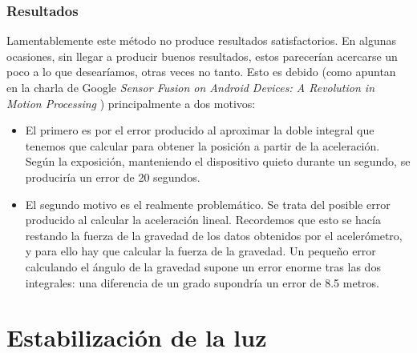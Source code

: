 \documentclass[a4paper,openright, 12pt]{book}
\begin{document}
\subsection{Resultados}
Lamentablemente este método no produce resultados satisfactorios. En algunas ocasiones, sin llegar a producir buenos resultados, estos parecerían acercarse un poco a lo que desearíamos, otras veces no tanto. Esto es debido  (como apuntan en la charla de Google \textit{Sensor Fusion on Android Devices: A Revolution in Motion Processing} \cite{googlesensor}) principalmente a dos motivos:
\begin{itemize}
\item El primero es por el error producido al aproximar la doble integral que tenemos que calcular para obtener la posición a partir de la aceleración. Según la exposición, manteniendo el dispositivo quieto durante un segundo, se produciría un error de 20 segundos.
\item El segundo motivo es el realmente problemático. Se trata del posible error producido al calcular la aceleración lineal. Recordemos que esto se hacía restando la fuerza de la gravedad de los datos obtenidos por el acelerómetro, y para ello hay que calcular la fuerza de la gravedad. Un pequeño error calculando el ángulo de la gravedad supone un error enorme tras las dos integrales: una diferencia de un grado supondría un error de 8.5 metros.
\end{itemize}

\chapter{Estabilización de la luz} \label{cap.luz}
\end{document}
